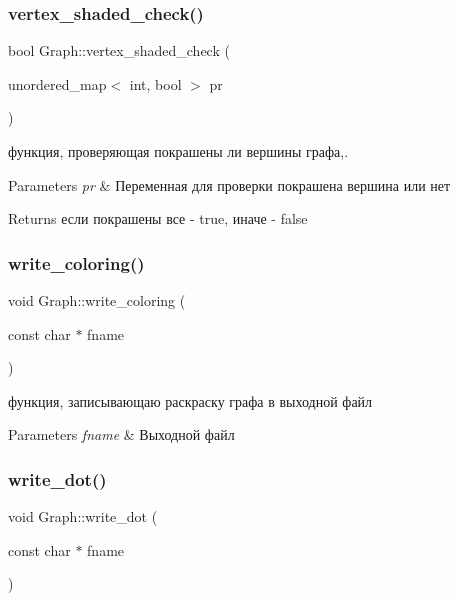 \subsubsection{\texorpdfstring{vertex\+\_\+shaded\+\_\+check()}{vertex\_shaded\_check()}}
{\footnotesize\ttfamily bool Graph\+::vertex\+\_\+shaded\+\_\+check (\begin{DoxyParamCaption}\item[{unordered\+\_\+map$<$ int, bool $>$}]{pr }\end{DoxyParamCaption})}



функция, проверяющая покрашены ли вершины графа,. 


\begin{DoxyParams}{Parameters}
{\em pr} & Переменная для проверки покрашена вершина или нет \\
\hline
\end{DoxyParams}
\begin{DoxyReturn}{Returns}
если покрашены все -\/ true, иначе -\/ false 
\end{DoxyReturn}
\mbox{\label{class_graph_a9b17ebc5472c5813dcef163e983a3a70}} 
\subsubsection{\texorpdfstring{write\+\_\+coloring()}{write\_coloring()}}
{\footnotesize\ttfamily void Graph\+::write\+\_\+coloring (\begin{DoxyParamCaption}\item[{const char $\ast$}]{fname }\end{DoxyParamCaption})}



функция, записывающаю раскраску графа в выходной файл 


\begin{DoxyParams}{Parameters}
{\em fname} & Выходной файл \\
\hline
\end{DoxyParams}
\mbox{\label{class_graph_a87b848e97501e9ed30f1ed0a457c9185}} 
\subsubsection{\texorpdfstring{write\+\_\+dot()}{write\_dot()}}
{\footnotesize\ttfamily void Graph\+::write\+\_\+dot (\begin{DoxyParamCaption}\item[{const char $\ast$}]{fname }\end{DoxyParamCaption})}



